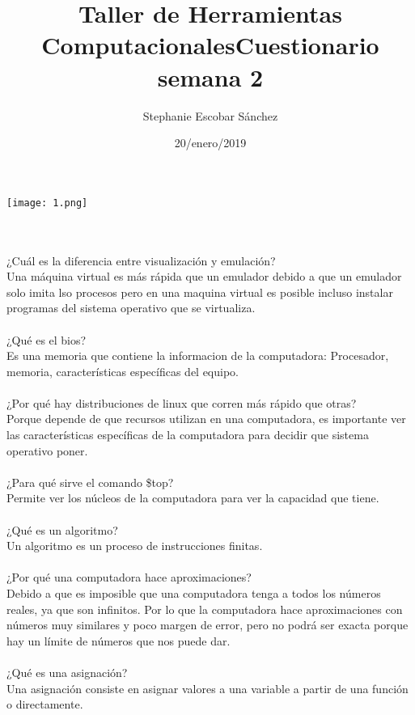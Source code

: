 \documentclass{article}
\title{\Huge Taller de Herramientas Computacionales}
\author{Stephanie Escobar Sánchez}
\date{20/enero/2019}
\begin{document}
	\maketitle
\begin{center}
	\texttt{[image: 1.png]}	
\end{center}
\newpage
\title{\Huge Cuestionario semana 2} \\
\\
¿Cuál es la diferencia entre visualización y emulación?\\
Una máquina virtual es más rápida que un emulador
debido a que un emulador solo imita lso procesos pero en una maquina virtual
es posible incluso instalar programas del sistema operativo que se virtualiza.\\
\\
¿Qué es el bios?\\
Es una memoria que contiene la informacion de la computadora: Procesador, memoria, características específicas
del equipo.\\
\\
¿Por qué hay distribuciones de linux que corren más rápido que otras?\\
Porque depende de que recursos utilizan en una computadora, es importante ver las características específicas de la computadora para decidir que sistema operativo poner.\\
\\
¿Para qué sirve el comando \$top?\\
Permite ver los núcleos de la computadora para ver la capacidad que tiene.\\
\\
¿Qué es un algoritmo?\\
Un algoritmo es un proceso de instrucciones finitas.\\
\\
¿Por qué una computadora hace aproximaciones?\\
Debido a que es imposible que una computadora tenga a todos los números reales, ya que son infinitos. Por lo que la computadora hace aproximaciones con números muy similares y poco margen de error, pero no podrá ser exacta porque hay un límite de números que nos puede dar.\\
\\
¿Qué es una asignación?\\
Una asignación consiste en asignar valores a una variable a partir de una función o directamente.\\
\\
\end{document}
